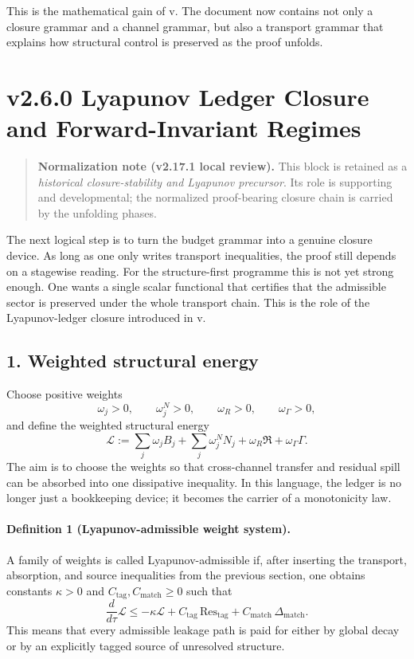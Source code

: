 This is the mathematical gain of v\docversion. The document now contains not only a
closure grammar and a channel grammar, but also a transport grammar that explains
how structural control is preserved as the proof unfolds.

\section*{v2.6.0 Lyapunov Ledger Closure and Forward-Invariant Regimes}

\begin{quote}
\textbf{Normalization note (v2.17.1 local review).}
This block is retained as a \emph{historical closure-stability and Lyapunov precursor}. Its role is supporting and developmental; the normalized proof-bearing closure chain is carried by the unfolding phases.
\end{quote}

The next logical step is to turn the budget grammar into a genuine closure device.
As long as one only writes transport inequalities, the proof still depends on a
stagewise reading. For the structure-first programme this is not yet strong enough.
One wants a single scalar functional that certifies that the admissible sector is
preserved under the whole transport chain. This is the role of the Lyapunov-ledger
closure introduced in v\docversion.

\subsection*{1. Weighted structural energy}
Choose positive weights
\[
\omega_j>0,
\qquad
\omega^{N}_j>0,
\qquad
\omega_R>0,
\qquad
\omega_\Gamma>0,
\]
and define the weighted structural energy
\[
\mathcal L
:=\sum_j \omega_j B_j + \sum_j \omega^{N}_j N_j + \omega_R\mathfrak R + \omega_\Gamma\Gamma.
\]
The aim is to choose the weights so that cross-channel transfer and residual spill
can be absorbed into one dissipative inequality. In this language, the ledger is no
longer just a bookkeeping device; it becomes the carrier of a monotonicity law.

\paragraph{Definition 1 (Lyapunov-admissible weight system).}
A family of weights is called Lyapunov-admissible if, after inserting the transport,
absorption, and source inequalities from the previous section, one obtains constants
$\kappa>0$ and $C_{\mathrm{tag}},C_{\mathrm{match}}\ge0$ such that
\[
\frac{d}{d\tau}\mathcal L
\le -\kappa \mathcal L
+ C_{\mathrm{tag}}\,\mathrm{Res}_{\mathrm{tag}}
+ C_{\mathrm{match}}\,\Delta_{\mathrm{match}}.
\]
This means that every admissible leakage path is paid for either by global decay or
by an explicitly tagged source of unresolved structure.

